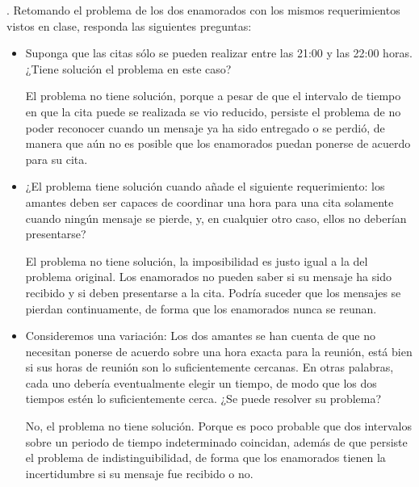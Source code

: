 . Retomando el problema de los dos enamorados con
los mismos requerimientos vistos en clase, responda
las siguientes preguntas:

\begin{itemize}
\item Suponga que las citas sólo se pueden realizar
  entre las 21:00 y las 22:00 horas. ¿Tiene solución
  el problema en este caso?
  
  El problema no tiene solución, porque a pesar de que el intervalo de tiempo en que la cita puede se realizada se vio reducido, persiste el problema de no poder reconocer cuando un mensaje ya ha sido entregado o se perdió, de manera que aún no es posible que los enamorados puedan ponerse de acuerdo para su cita.

\item ¿El problema tiene solución cuando añade el siguiente
  requerimiento: los amantes deben ser capaces de coordinar
  una hora para una cita solamente cuando ningún mensaje
  se pierde, y, en cualquier otro caso, ellos no deberían
  presentarse?
  
 El problema no tiene solución, la imposibilidad es justo igual a la del problema original. Los enamorados no pueden saber si su mensaje ha sido recibido y si deben presentarse a la cita.  Podría suceder que los mensajes se pierdan continuamente, de forma que los enamorados nunca se reunan.

\item Consideremos una variación: Los dos amantes se han
  cuenta de que no necesitan ponerse de acuerdo sobre una
  hora exacta para la reunión, está bien si sus horas de
  reunión son lo suficientemente cercanas. En otras palabras,
  cada uno debería eventualmente elegir un tiempo, de modo
  que los dos tiempos estén lo suficientemente cerca. ¿Se
  puede resolver su problema?
  
  No, el problema no tiene solución. Porque es poco probable que dos intervalos sobre un periodo de tiempo indeterminado coincidan, además de que persiste el problema de indistinguibilidad, de forma que los enamorados tienen la incertidumbre si su mensaje fue recibido o no.
  
\end{itemize}
